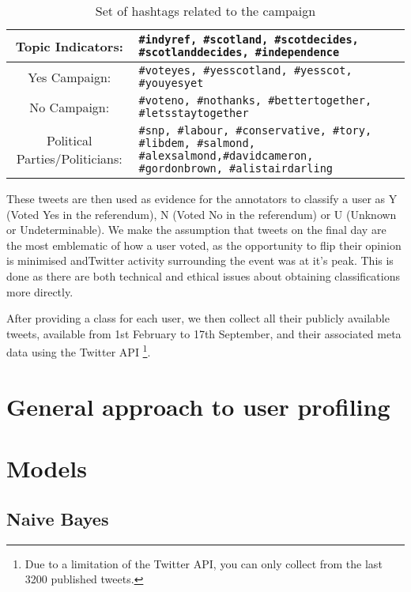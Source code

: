 \documentclass[bsc,frontabs,singlespacing,parskip]{infthesis}     %
\begin{document}
\begin{table}
\begin{center}
    \begin{tabular}{ c p{7cm} }
    \hline
    Topic Indicators: & \tt{\#indyref, \#scotland, \#scotdecides, \#scotlanddecides, \#independence} \\ \hline	
     Yes Campaign: & \tt{\#voteyes, \#yesscotland, \#yesscot, \#youyesyet}\\ \hline
     No Campaign: & \tt{\#voteno, \#nothanks, \#bettertogether, \#letsstaytogether} \\ \hline
    Political Parties/Politicians: & \texttt{\#snp, \#labour, \#conservative, \#tory, \#libdem, \#salmond, \#alexsalmond,\#davidcameron, \#gordonbrown, \#alistairdarling}\\
	\hline
   \end{tabular}
\caption{Set of hashtags related to the campaign}
  \label{tab:hashtagtable}
\end{center}
\end{table}
These tweets are then used as evidence for the annotators to classify a user as Y (Voted Yes in the referendum), N (Voted No in the referendum) or U (Unknown or Undeterminable). We make the assumption that tweets on the final day are the most emblematic of how a user voted, as the opportunity to flip their opinion is minimised andTwitter activity surrounding the event was at it's peak. This is done as there are both technical and ethical issues about obtaining classifications more directly.

After providing a class for each user, we then collect all their publicly available tweets, available from 1st February to 17th September, and their associated meta data using the Twitter API \footnote{Due to a limitation of the Twitter API, you can only collect from the last 3200 published tweets.}. 

\section{General approach to user profiling}
\section{Models}
\subsection{Naive Bayes}
\end{document}
